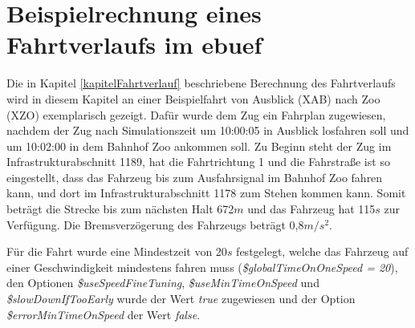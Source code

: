 \section{Beispielrechnung eines Fahrtverlaufs im \ac{ebuef}} \label{beispielrechnungKapitel}
Die in Kapitel \ref{kapitelFahrtverlauf} beschriebene Berechnung des Fahrtverlaufs wird in diesem Kapitel an einer Beispielfahrt von Ausblick (XAB) nach Zoo (XZO) exemplarisch gezeigt. Dafür wurde dem Zug ein Fahrplan zugewiesen, nachdem der Zug nach Simulationszeit um 10:00:05 in Ausblick losfahren soll und um 10:02:00 in dem Bahnhof Zoo ankommen soll. Zu Beginn steht der Zug im Infrastrukturabschnitt 1189, hat die Fahrtrichtung 1 und die Fahrstraße ist so eingestellt, dass das Fahrzeug bis zum Ausfahrsignal im Bahnhof Zoo fahren kann, und dort im Infrastrukturabschnitt 1178 zum Stehen kommen kann. Somit beträgt die Strecke bis zum nächsten Halt 672$m$ und das Fahrzeug hat 115$s$ zur Verfügung. Die Bremsverzögerung des Fahrzeugs beträgt 0,8$m/s^{2}$.

Für die Fahrt wurde eine Mindestzeit von 20$s$ festgelegt, welche das Fahrzeug auf einer Geschwindigkeit mindestens fahren muss (\textit{\$globalTimeOnOneSpeed = 20}), den Optionen \textit{\$useSpeedFineTuning}, \textit{\$useMinTimeOnSpeed} und \textit{\$slowDownIfTooEarly} wurde der Wert \textit{true} zugewiesen und der Option \textit{\$errorMinTimeOnSpeed} der Wert \textit{false}.

